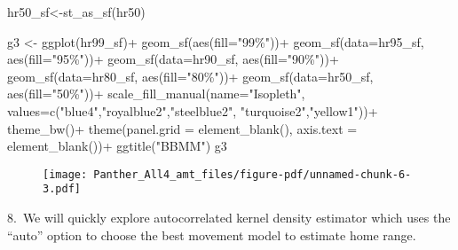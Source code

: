 \documentclass[
  letterpaper,
]{book}
\newenvironment{Shaded}{\begin{snugshade}}{\end{snugshade}}
\newcommand{\AttributeTok}[1]{\textcolor[rgb]{0.40,0.45,0.13}{#1}}
\newcommand{\FunctionTok}[1]{\textcolor[rgb]{0.28,0.35,0.67}{#1}}
\newcommand{\NormalTok}[1]{\textcolor[rgb]{0.00,0.23,0.31}{#1}}
\newcommand{\OtherTok}[1]{\textcolor[rgb]{0.00,0.23,0.31}{#1}}
\newcommand{\SpecialCharTok}[1]{\textcolor[rgb]{0.37,0.37,0.37}{#1}}
\newcommand{\StringTok}[1]{\textcolor[rgb]{0.13,0.47,0.30}{#1}}
\begin{document}
\begin{Shaded}
\begin{Highlighting}[]
\NormalTok{hr50\_sf}\OtherTok{\textless{}{-}}\FunctionTok{st\_as\_sf}\NormalTok{(hr50)}

\NormalTok{g3 }\OtherTok{\textless{}{-}} \FunctionTok{ggplot}\NormalTok{(hr99\_sf)}\SpecialCharTok{+}
  \FunctionTok{geom\_sf}\NormalTok{(}\FunctionTok{aes}\NormalTok{(}\AttributeTok{fill=}\StringTok{"99\%"}\NormalTok{))}\SpecialCharTok{+}
  \FunctionTok{geom\_sf}\NormalTok{(}\AttributeTok{data=}\NormalTok{hr95\_sf, }\FunctionTok{aes}\NormalTok{(}\AttributeTok{fill=}\StringTok{"95\%"}\NormalTok{))}\SpecialCharTok{+} 
  \FunctionTok{geom\_sf}\NormalTok{(}\AttributeTok{data=}\NormalTok{hr90\_sf, }\FunctionTok{aes}\NormalTok{(}\AttributeTok{fill=}\StringTok{"90\%"}\NormalTok{))}\SpecialCharTok{+}
  \FunctionTok{geom\_sf}\NormalTok{(}\AttributeTok{data=}\NormalTok{hr80\_sf, }\FunctionTok{aes}\NormalTok{(}\AttributeTok{fill=}\StringTok{"80\%"}\NormalTok{))}\SpecialCharTok{+}
  \FunctionTok{geom\_sf}\NormalTok{(}\AttributeTok{data=}\NormalTok{hr50\_sf, }\FunctionTok{aes}\NormalTok{(}\AttributeTok{fill=}\StringTok{"50\%"}\NormalTok{))}\SpecialCharTok{+}
  \FunctionTok{scale\_fill\_manual}\NormalTok{(}\AttributeTok{name=}\StringTok{"Isopleth"}\NormalTok{, }\AttributeTok{values=}\FunctionTok{c}\NormalTok{(}\StringTok{"blue4"}\NormalTok{,}\StringTok{"royalblue2"}\NormalTok{,}\StringTok{"steelblue2"}\NormalTok{, }\StringTok{"turquoise2"}\NormalTok{,}\StringTok{"yellow1"}\NormalTok{))}\SpecialCharTok{+}
  \FunctionTok{theme\_bw}\NormalTok{()}\SpecialCharTok{+}
  \FunctionTok{theme}\NormalTok{(}\AttributeTok{panel.grid =} \FunctionTok{element\_blank}\NormalTok{(), }\AttributeTok{axis.text =} \FunctionTok{element\_blank}\NormalTok{())}\SpecialCharTok{+}
  \FunctionTok{ggtitle}\NormalTok{(}\StringTok{"BBMM"}\NormalTok{)}
\NormalTok{g3}
\end{Highlighting}
\end{Shaded}

\begin{figure}[H]

{\centering \texttt{[image: Panther\_All4\_amt\_files/figure-pdf/unnamed-chunk-6-3.pdf]}

}

\end{figure}

8.~We will quickly explore autocorrelated kernel density estimator which
uses the ``auto'' option to choose the best movement model to estimate
home range.
\end{document}
